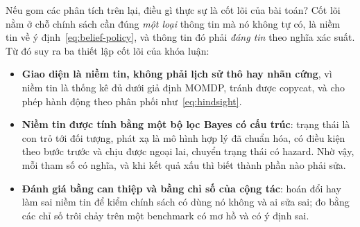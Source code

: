 Nếu gom các phân tích trên lại, điều gì thực sự là cốt lõi của bài toán? Cốt lõi nằm ở chỗ chính sách cần đúng \emph{một loại} thông tin mà nó không tự có, là niềm tin về ý định~\eqref{eq:belief-policy}, và thông tin đó phải \emph{đáng tin} theo nghĩa xác suất. Từ đó suy ra ba thiết lập cốt lõi của khóa luận:
\begin{itemize}
  \item \textbf{Giao diện là niềm tin, không phải lịch sử thô hay nhãn cứng}, vì niềm tin là thống kê đủ dưới giả định MOMDP, tránh được copycat, và cho phép hành động theo phân phối như~\eqref{eq:hindsight}.
  \item \textbf{Niềm tin được tính bằng một bộ lọc Bayes có cấu trúc}: trạng thái là con trỏ tới đối tượng, phát xạ là mô hình hợp lý đã chuẩn hóa, có điều kiện theo bước trước và chịu được ngoại lai, chuyển trạng thái có hazard. Nhờ vậy, mỗi tham số có nghĩa, và khi kết quả xấu thì biết thành phần nào phải sửa.
  \item \textbf{Đánh giá bằng can thiệp và bằng chỉ số của cộng tác}: hoán đổi hay làm sai niềm tin để kiểm chính sách có dùng nó không và ai sửa sai; đo bằng các chỉ số trôi chảy trên một benchmark có mơ hồ và có ý định sai.
\end{itemize}

